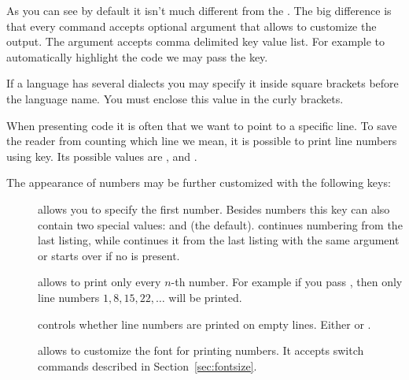As you can see by default it isn't much different from the . The big difference is that every command accepts optional
argument that allows to customize the output. The argument accepts comma
delimited key value list. For example to automatically highlight the code we
may pass the  key.
\begin{example}

\end{example}
If a language has several dialects you may specify it inside square brackets
before the language name. You must enclose this value in the curly brackets.
\begin{example}
TeX},
]{hello.tex}
\end{example}
When presenting code it is often that we want to point to a specific line. To
save the reader from counting which line we mean, it is possible to print line
numbers using  key. Its possible values are ,
 and .
\begin{example}

\end{example}
The appearance of numbers may be further customized with the following keys:
\begin{description}
  \item[] allows you to specify the first number. Besides
    numbers this key can also contain two special values:  and
     (the default).  continues numbering from the last
    listing, while  continues it from the last listing with the
    same  argument or starts over if no  is present.
  \item[] allows to print only every \(n\)-th number. For
    example if you pass , then only line numbers \(1, 8,
    15, 22, \ldots\) will be printed.
  \item[] controls whether line numbers are printed on
    empty lines. Either  or .
  \item[] allows to customize the font for printing
    numbers. It accepts switch commands described in Section~\ref{sec:fontsize}.
\end{description}
\begin{example}

\end{example}

